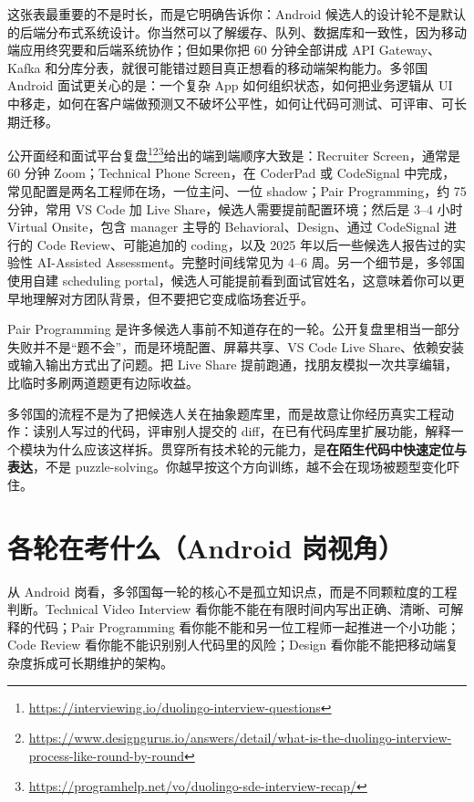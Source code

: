 这张表最重要的不是时长，而是它明确告诉你：Android 候选人的设计轮不是默认的后端分布式系统设计。你当然可以了解缓存、队列、数据库和一致性，因为移动端应用终究要和后端系统协作；但如果你把 60 分钟全部讲成 API Gateway、Kafka 和分库分表，就很可能错过题目真正想看的移动端架构能力。多邻国 Android 面试更关心的是：一个复杂 App 如何组织状态，如何把业务逻辑从 UI 中移走，如何在客户端做预测又不破坏公平性，如何让代码可测试、可评审、可长期迁移。

\srccommunity 公开面经和面试平台复盘\footnote{\url{https://interviewing.io/duolingo-interview-questions}}\footnote{\url{https://www.designgurus.io/answers/detail/what-is-the-duolingo-interview-process-like-round-by-round}}\footnote{\url{https://programhelp.net/vo/duolingo-sde-interview-recap/}}给出的端到端顺序大致是：Recruiter Screen，通常是 60 分钟 Zoom；Technical Phone Screen，在 CoderPad 或 CodeSignal 中完成，常见配置是两名工程师在场，一位主问、一位 shadow；Pair Programming，约 75 分钟，常用 VS Code 加 Live Share，候选人需要提前配置环境；然后是 3--4 小时 Virtual Onsite，包含 manager 主导的 Behavioral、Design、通过 CodeSignal 进行的 Code Review、可能追加的 coding，以及 2025 年以后一些候选人报告过的实验性 AI-Assisted Assessment。完整时间线常见为 4--6 周。另一个细节是，多邻国使用自建 scheduling portal，候选人可能提前看到面试官姓名，这意味着你可以更早地理解对方团队背景，但不要把它变成临场套近乎。

\begin{pitfall}[最容易被低估的轮次不是算法]
Pair Programming 是许多候选人事前不知道存在的一轮。公开复盘里相当一部分失败并不是“题不会”，而是环境配置、屏幕共享、VS Code Live Share、依赖安装或输入输出方式出了问题。把 Live Share 提前跑通，找朋友模拟一次共享编辑，比临时多刷两道题更有边际收益。
\end{pitfall}

\begin{idea}
多邻国的流程不是为了把候选人关在抽象题库里，而是故意让你经历真实工程动作：读别人写过的代码，评审别人提交的 diff，在已有代码库里扩展功能，解释一个模块为什么应该这样拆。贯穿所有技术轮的元能力，是\textbf{在陌生代码中快速定位与表达}，不是 puzzle-solving。你越早按这个方向训练，越不会在现场被题型变化吓住。
\end{idea}

\section{各轮在考什么（Android 岗视角）}

从 Android 岗看，多邻国每一轮的核心不是孤立知识点，而是不同颗粒度的工程判断。Technical Video Interview 看你能不能在有限时间内写出正确、清晰、可解释的代码；Pair Programming 看你能不能和另一位工程师一起推进一个小功能；Code Review 看你能不能识别别人代码里的风险；Design 看你能不能把移动端复杂度拆成可长期维护的架构。


